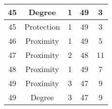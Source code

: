 \documentclass[results.tex]{subfiles}
\begin{document}
\begin{center}
\begin{tabular}{| c || c | c | c | c |}
            \hline
            45                      & Degree                       & 1                      & 49                      & 3                    \\
            \hline
            45                      & Protection                   & 1                      & 49                      & 3                    \\
            \hline
            46                      & Proximity                    & 1                      & 49                      & 5                    \\
            \hline
            47                      & Proximity                    & 2                      & 48                      & 11                   \\
            \hline
            48                      & Proximity                    & 1                      & 49                      & 7                    \\
            \hline
            49                      & Proximity                    & 3                      & 47                      & 9                    \\
            \hline
            49                      & Degree                       & 3                      & 47                      & 9                    \\
            \hline
        \end{tabular}
    \end{center}
\end{document}
